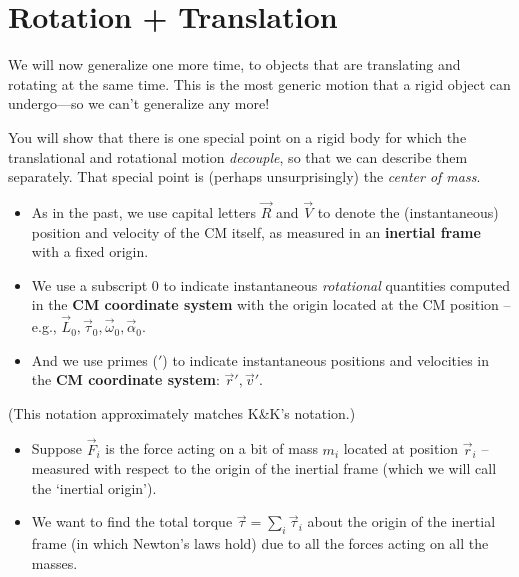 \documentclass[11pt, letterpaper, openany]{book}
\begin{document}
\section*{Rotation + Translation}

We will now generalize one more time, to objects that are translating and rotating at the same time. This is the most generic motion that a rigid object can undergo---so we can't generalize any more!

You will show that there is one special point on a rigid body for which the translational and rotational motion \textit{decouple}, so that we can describe them separately. That special point is (perhaps unsurprisingly) the \textit{center of mass}.

\begin{itemize}
    \item As in the past, we use capital letters $\vec{R}$ and $\vec{V}$ to denote the (instantaneous) position and velocity of the CM itself, as measured in an \textbf{inertial frame} with a fixed origin.
    \item We use a subscript 0 to indicate instantaneous \textit{rotational} quantities computed in the \textbf{CM coordinate system} with the origin located at the CM position -- e.g., $\vec{L}_0, \vec{\tau}_0, \vec{\omega}_0, \vec{\alpha}_0$.
    \item And we use primes ($'$) to indicate instantaneous positions and velocities in the \textbf{CM coordinate system}: $\vec{r}', \vec{v}'$.
\end{itemize}

(This notation approximately matches K\&K's notation.)

\begin{itemize}
    \item Suppose $\vec{F}_i$ is the force acting on a bit of mass $m_i$ located at position $\vec{r}_i$ -- measured with respect to the origin of the inertial frame (which we will call the `inertial origin').
    \item We want to find the total torque $\vec{\tau} = \sum_i \vec{\tau}_i$ about the origin of the inertial frame (in which Newton's laws hold) due to all the forces acting on all the masses.
\end{itemize}
\end{document}
